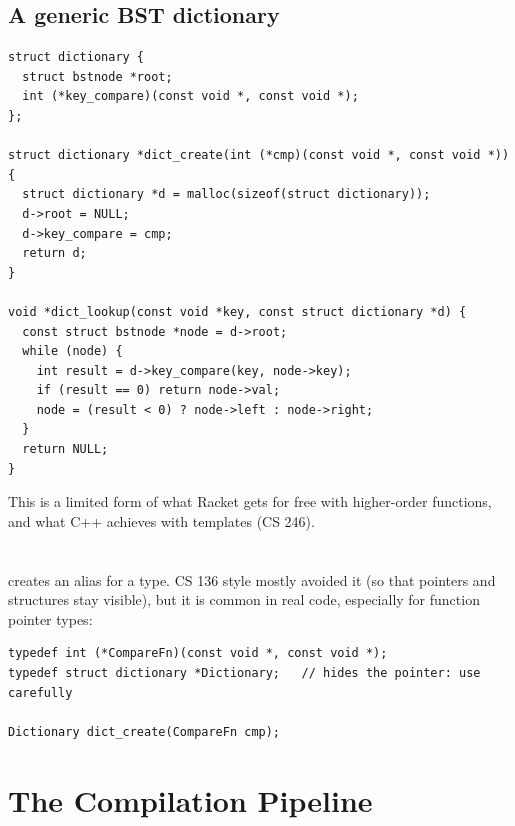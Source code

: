 \subsection{A generic BST dictionary}
\begin{lstlisting}[style=c]
struct dictionary {
  struct bstnode *root;
  int (*key_compare)(const void *, const void *);
};

struct dictionary *dict_create(int (*cmp)(const void *, const void *)) {
  struct dictionary *d = malloc(sizeof(struct dictionary));
  d->root = NULL;
  d->key_compare = cmp;
  return d;
}

void *dict_lookup(const void *key, const struct dictionary *d) {
  const struct bstnode *node = d->root;
  while (node) {
    int result = d->key_compare(key, node->key);
    if (result == 0) return node->val;
    node = (result < 0) ? node->left : node->right;
  }
  return NULL;
}
\end{lstlisting}
This is a limited form of what Racket gets for free with higher-order functions, and what C++
achieves with templates (CS 246).

\section{}

 creates an alias for a type. CS 136 style mostly avoided it (so that pointers and
structures stay visible), but it is common in real code, especially for function pointer types:
\begin{lstlisting}[style=c]
typedef int (*CompareFn)(const void *, const void *);
typedef struct dictionary *Dictionary;   // hides the pointer: use carefully

Dictionary dict_create(CompareFn cmp);
\end{lstlisting}

\section{The Compilation Pipeline}


